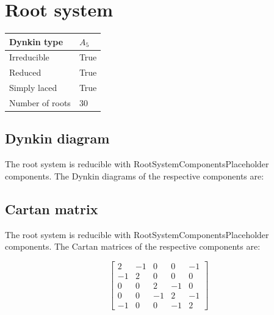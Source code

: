 \documentclass[11pt]{article}
\theoremstyle{definition}
\newif\ifrootsystemirreducible
\begin{document}
\newpage
\section{Root system}

\begin{tabular}{|l|l|}
	\hline
    Dynkin type & $A_5$ \\
	\hline
    Irreducible & True \\
	\hline
    Reduced & True \\
	\hline
	Simply laced & True \\
	\hline
	Number of roots & $30$ \\
	\hline
\end{tabular}

\subsection{Dynkin diagram}

\ifrootsystemirreducible
The root system is irreducible and has Dynkin diagram:
\else
The root system is reducible with RootSystemComponentsPlaceholder components. The Dynkin diagrams of the respective components are:
\fi

\begin{center}
\end{center}

\subsection{Cartan matrix}

\ifrootsystemirreducible
The root system is irreducible and has Cartan matrix:
\else
The root system is reducible with RootSystemComponentsPlaceholder components. The Cartan matrices of the respective components are:
\fi

\[
\left[\begin{matrix}2 & -1 & 0 & 0 & -1\\-1 & 2 & 0 & 0 & 0\\0 & 0 & 2 & -1 & 0\\0 & 0 & -1 & 2 & -1\\-1 & 0 & 0 & -1 & 2\end{matrix}\right]
\]
\end{document}
